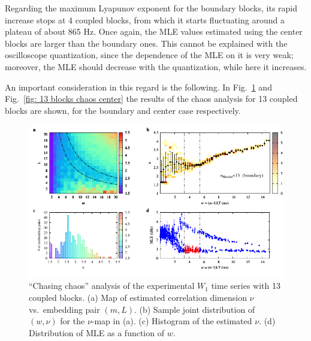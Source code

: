 Regarding the maximum Lyapunov exponent for the boundary blocks, its rapid increase stops at 4 coupled
blocks, from which it starts fluctuating around a plateau of about 865 Hz.
Once again, the MLE values estimated using the center blocks are larger than the boundary ones.
This cannot be explained with the oscilloscope quantization, since the dependence of the MLE on
it is very weak; moreover, the MLE should decrease with the quantization, while here it increases.

An important consideration in this regard is the following. In Fig.~\ref{fig: 13 blocks chaos boundary}
and Fig.~\ref{fig: 13 blocks chaos center}
the results of the chaos analysis for 13 coupled blocks are shown, for the boundary and center case
respectively.

\begin{figure}[!htbp]
    \centering
    \includegraphics[width=\linewidth]{../blocks/13_blocks/edge/2e5_points/plots/chaos_low.pdf}
    \caption{``Chasing chaos'' analysis of the experimental $W_1$ time series with 13 coupled blocks.
    (a) Map of estimated correlation dimension $\nu$ vs.\ embedding pair $(m, L)$.
    (b) Sample joint distribution of $(w,\nu)$ for the $\nu$-map in (a).
    (c) Histogram of the estimated $\nu$. (d) Distribution of MLE as a function of $w$.
    }\label{fig: 13 blocks chaos boundary}
\end{figure}

